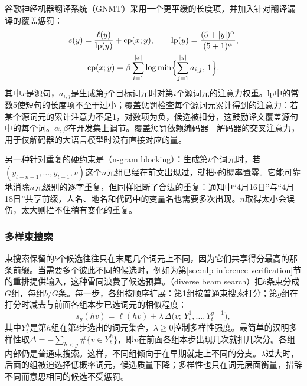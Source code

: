 谷歌神经机器翻译系统（GNMT）采用一个更平缓的长度项，并加入针对翻译漏译的覆盖惩罚\cite{nlp-inference-wu2016gnmt}：
\begin{equation}
 \begin{gathered}
 s(y)=\frac{\ell(y)}{\mathrm{lp}(y)}+\mathrm{cp}(x;y),\qquad
 \mathrm{lp}(y)=\frac{(5+|y|)^{\alpha}}{(5+1)^{\alpha}},\\
 \mathrm{cp}(x;y)=\beta\sum_{i=1}^{|x|}\log\min\Bigl\{\sum_{j=1}^{|y|}a_{i,j},\,1\Bigr\}.
 \end{gathered}
 \label{eq:nlp-inference-gnmt}
\end{equation}
其中$x$是源句，$a_{i,j}$是生成第$j$个目标词元时对第$i$个源词元的注意力权重。$\mathrm{lp}$中的常数5使短句的长度项不至于过小；覆盖惩罚检查每个源词元累计得到的注意力：若某个源词元的累计注意力不足1，对数项为负，候选被扣分，这鼓励译文覆盖源句中的每个词。$\alpha,\beta$在开发集上调节。覆盖惩罚依赖编码器—解码器的交叉注意力，用于仅解码器的大语言模型时没有直接对应的量。

另一种针对重复的硬约束是（n-gram blocking）：生成第$t$个词元时，若$(y_{t-n+1},\ldots,y_{t-1},v)$这个$n$元组已经在前文出现过，就把$v$的概率置零。它能可靠地消除$n$元级别的逐字重复，但同样阻断了合法的重复：通知中“4月16日”与“4月18日”共享前缀，人名、地名和代码中的变量名也需要多次出现。$n$取得太小会误伤，太大则拦不住稍有变化的重复。

\subsubsection{多样束搜索}
\label{sec:nlp-inference-diverse-beam}

束搜索保留的$b$个候选往往只在末尾几个词元上不同，因为它们共享得分最高的那条前缀。当需要多个彼此不同的候选时，例如为第\ref{sec:nlp-inference-verification}节的重排提供输入，这种雷同浪费了候选预算。（diverse beam search）把$b$条束分成$G$组，每组$b/G$条。每一步，各组按顺序扩展：第1组按普通束搜索打分；第$g$组在打分时减去与前面各组本步已选词元的相似程度：
\begin{equation}
 s_g(hv)=\ell(hv)+\lambda\,\Delta\bigl(v;\,Y_t^{1},\ldots,Y_t^{g-1}\bigr),
 \label{eq:nlp-inference-diverse-beam}
\end{equation}
其中$Y_t^{h}$是第$h$组在第$t$步选出的词元集合，$\lambda\geq0$控制多样性强度。最简单的汉明多样性取$\Delta=-\sum_{h<g}\#\{v\in Y_t^{h}\}$，即$v$在前面各组本步出现几次就扣几次分。各组内部仍是普通束搜索。这样，不同组倾向于在早期就走上不同的分支。$\lambda$过大时，后面的组被迫选择低概率词元，候选质量下降；多样性也只在词元层面衡量，措辞不同而意思相同的候选不受惩罚。

